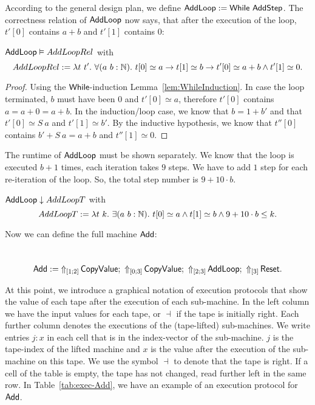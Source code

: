 According to the general design plan, we define $\MS{AddLoop} := \While~\MS{AddStep}$.  The correctness relation of $\MS{AddLoop}$ now says, that
after the execution of the loop, $t'[0]$ contains $a+b$ and $t'[1]$ contains $0$:
\begin{lemma}
  \label{lem:Add_Loop_Sem}
  $\MS{AddLoop} \Realise AddLoopRel$ with
  \[
    AddLoopRel := \lambda t~t'.~\forall (a~b:\Nat).~t[0] \simeq a \rightarrow t[1] \simeq b \rightarrow t'[0] \simeq a+b \land t'[1] \simeq 0.
  \]
\end{lemma}
\begin{proof}
  Using the $\While$-induction Lemma~\ref{lem:WhileInduction}.  In case the loop terminated, $b$ must have been $0$ and $t'[0] \simeq a$, therefore
  $t'[0]$ contains $a=a+0=a+b$.  In the induction/loop case, we know that $b=1+b'$ and that $t'[0] \simeq S~a$ and $t'[1] \simeq b'$.  By the
  inductive hypothesis, we know that $t''[0]$ contains $b' + S~a = a+b$ and $t''[1] \simeq 0$.
\end{proof}

The runtime of $\MS{AddLoop}$ must be shown separately.  We know that the loop is executed $b+1$ times, each iteration takes $9$ steps.  We have to
add $1$ step for each re-iteration of the loop.  So, the total step number is $9+10 \cdot b$.
\begin{lemma}
  \label{lem:Add_Loop_TerminatesIn}
  $\MS{AddLoop} \downarrow AddLoopT$ with
  \[
    AddLoopT := \lambda t~k.~\exists (a~b:\Nat).~t[0] \simeq a \land t[1] \simeq b \land 9+10 \cdot b \leq k.
  \]
\end{lemma}

Now we can define the full machine $\MS{Add}$:
\begin{definition}[$\MS{Add}$]
  \label{def:Add}
  ~
  \[
    \MS{Add} :=
    \LiftTapes{\MS{CopyValue}}{\Vector{1;2}} \Seq
    \LiftTapes{\MS{CopyValue}}{\Vector{0;3}} \Seq
    \LiftTapes{\MS{AddLoop}}{\Vector{2;3}} \Seq
    \LiftTapes{\MS{Reset}}{\Vector{3}}.
  \]
\end{definition}

At this point, we introduce a graphical notation of execution protocols that show the value of each tape after the execution of each sub-machine.  In
the left column we have the input values for each tape, or $\dashv$ if the tape is initially right.  Each further column denotes the executions of the
(tape-lifted) sub-machines.  We write entries $j: x$ in each cell that is in the index-vector of the sub-machine.  $j$ is the tape-index of the lifted
machine and $x$ is the value after the execution of the sub-machine on this tape.  We use the symbol $\dashv$ to denote that the tape is right.  If a
cell of the table is empty, the tape has not changed, read further left in the same row.  In Table~\ref{tab:exec-Add}, we have an example of an
execution protocol for $\MS{Add}$.

